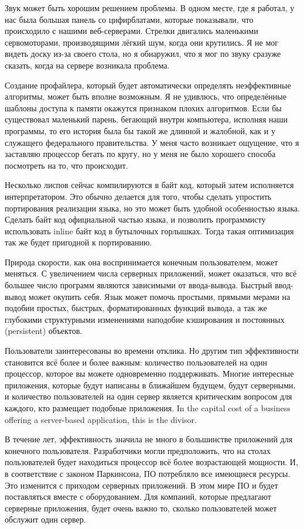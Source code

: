 \documentclass[ebook,12pt,oneside,openany]{memoir}
\begin{document}
Звук может быть хорошим решением проблемы. В одном месте, где я
работал, у нас была большая панель со цифирблатами, которые
показывали, что происходило с нашими веб-серверами. Стрелки двигались
маленькими сервомоторами, производящими лёгкий шум, когда они
крутились. Я не мог видеть доску из-за своего стола, но я обнаружил,
что я мог по звуку сразуже сказать, когда на сервере возникала
проблема.

Создание профайлера, который будет автоматически определять
неэффективные алгоритмы, может быть вполне возможным. Я не удивлюсь,
что определённые шаблоны доступа к памяти окажутся признаком плохих
алгоритмов. Если бы существовал маленький парень, бегающий внутри
компьютера, исполняя наши программы, то его история была бы такой же
длинной и жалобной, как и у служащего федерального правительства. У
меня часто возникает ощущение, что я заставляю процессор бегать по
кругу, но у меня не было хорошего способа посмотреть на то, что
происходит.

Несколько лиспов сейчас компилируются в байт код, который затем
исполняется интерпретатором. Это обычно делается для того, чтобы
сделать упростить портирования реализации языка, но это может быть
удобной особенностью языка. Сделать байт код официальной частью языка,
и позволить программисту использовать inline байт код в бутылочных
горлышках. Тогда такая оптимизация так же будет пригодной к
портированию.

Природа скорости, как она воспринимается конечным пользователем, может
меняться. С увеличением числа серверных приложений, может оказаться,
что всё большее число программ являются зависимыми от ввода-вывода.
Быстрый ввод-вывод может окупить себя. Язык может помочь простыми,
прямыми мерами на подобии простых, быстрых, форматированных функций
вывода, а так же глубокими структурными изменениями наподобие
кэширования и постоянных (persistent) объектов.

Пользователи заинтересованы во времени отклика. Но другим тип
эффективности становится всё более и более важным: количество
пользователей на один процессор, которое вы можете одновременно
поддерживать. Многие интересные приложения, которые будут написаны в
ближайшем будущем, будут серверными, и количество пользователей на
один сервер является критическим вопросом для каждого, кто размещает
подобные приложения. In the capital cost of a business offering a
server-based application, this is the divisor.

В течение лет, эффективность значила не много в большинстве приложений
для конечного пользователя. Разработчики могли предположить, что на
столах пользователей будет находиться процессор всё более возрастающей
мощности. И, в соответствие с законом Паркинсона, ПО потребляло все
имеющиеся ресурсы. Это изменится с приходом серверных приложений. В
этом мире ПО и будет поставляться вместе с оборудованием. Для
компаний, которые предлагают серверные приложения, будет очень важно
то, сколько пользователей может обслужит один сервер.
\end{document}
